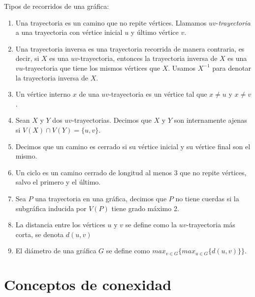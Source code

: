     
    \begin{definicion} Tipos de recorridos de una gr\'afica:
    \label{def:tipos de recorridos}
    \begin{enumerate}
        \item Una trayectoria es un camino que no repite v\'ertices. Llamamos
        $uv$-\textit{trayectoria} a una trayectoria con v\'ertice inicial $u$ y
        \'ultimo v\'ertice $v$.
        \item Una trayectoria inversa es una trayectoria recorrida de manera
        contraria, es decir, si $X$ es una $uv$-trayectoria, entonces la
        trayectoria inversa de $X$ es una $vu$-trayectoria que tiene los mismos
        v\'ertices que $X$. Usamos $X^{-1}$ para denotar la trayectoria inversa
        de $X$.
        \item Un v\'ertice interno $x$ de una $uv$-trayectoria es un v\'ertice
        tal que $x \neq u$ y $x \neq v$.
        \item Sean $X$ y $Y$ dos $uv$-trayectorias. Decimos que $X$ y $Y$ son
        internamente ajenas si $V(X) \cap V(Y)=\{u,v\}$.
        \item Decimos que un camino es cerrado si su v\'ertice inicial y su
        v\'ertice final son el mismo.
        \item Un ciclo es un camino cerrado de longitud al menos $3$ que no
        repite v\'ertices, salvo el primero y el \'ultimo.
        \item Sea $P$ una trayectoria en una gr\'afica, decimos que $P$ no tiene
        cuerdas si la subgr\'afica inducida por $V(P)$ tiene grado m\'aximo 2.
        \item La distancia entre los v\'ertices $u$ y $v$ se define como la
        $uv$-trayectoria m\'as corta, se denota $d(u,v)$
        \item El di\'ametro de una gr\'afica $G$ se define como $max_{v\in
        G}\{max_{u\in G}\{d(u,v)\}\}$.
    \end{enumerate}
\end{definicion}

\section{Conceptos de conexidad}
\label{sec:conexidad}

